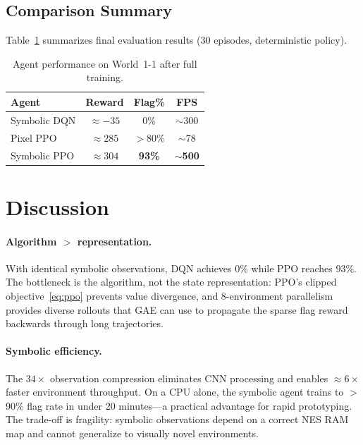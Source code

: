 \documentclass[10pt,a4paper,twocolumn]{article}
\begin{document}
\subsection{Comparison Summary}

Table~\ref{tab:results} summarizes final evaluation results (30 episodes,
deterministic policy).

\begin{table}[H]
\centering
\small
\caption{Agent performance on World~1-1 after full training.}
\label{tab:results}
\begin{tabularx}{\linewidth}{@{}Xccc@{}}
\toprule
\textbf{Agent} & \textbf{Reward} & \textbf{Flag\%} & \textbf{FPS} \\
\midrule
Symbolic DQN  & $\approx -35$ & 0\%              & $\sim$300 \\
Pixel PPO     & $\approx 285$ & $>$80\%          & $\sim$78  \\
Symbolic PPO  & $\approx 304$ & \textbf{93\%}    & $\sim$\textbf{500} \\
\bottomrule
\end{tabularx}
\end{table}

\section{Discussion}

\paragraph{Algorithm $>$ representation.}
With identical symbolic observations, DQN achieves 0\% while PPO reaches
93\%. The bottleneck is the algorithm, not the state representation:
PPO's clipped objective~\eqref{eq:ppo} prevents value divergence, and
8-environment parallelism provides diverse rollouts that GAE can use to
propagate the sparse flag reward backwards through long trajectories.

\paragraph{Symbolic efficiency.}
The $34\!\times$ observation compression eliminates CNN processing and
enables $\approx\!6\!\times$ faster environment throughput.
On a CPU alone, the symbolic agent trains to $>$90\% flag rate in under
20 minutes---a practical advantage for rapid prototyping.
The trade-off is fragility: symbolic observations depend on a correct NES
RAM map and cannot generalize to visually novel environments.
\end{document}
